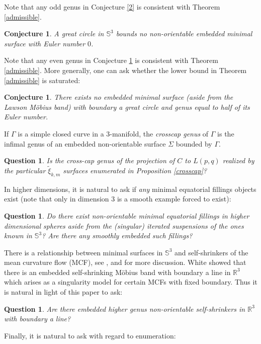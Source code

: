 \documentclass[11pt, reqno]{amsart}
\newtheorem{conj}[thm]{Conjecture}
\newtheorem{question}[thm]{Question}
\numberwithin{equation}{section}
\begin{document}
Note that any odd genus in Conjecture \ref{2} is consistent with Theorem \ref{admissible}.  

\begin{conj}\label{0}
A great circle in $\mathbb{S}^3$ bounds no non-orientable embedded minimal surface with Euler number $0$.
\end{conj}
Note that any even genus in Conjecture \ref{0} is consistent with Theorem \ref{admissible}.  
More generally, one can ask whether the lower bound in Theorem \ref{admissible} is saturated:
\begin{conj}
There exists no embedded minimal surface (aside from the Lawson M\"obius band) with boundary a great circle and genus equal to half of its Euler number.
\end{conj}
If $\Gamma$ is a simple closed curve in a $3$-manifold, the \emph{crosscap genus} of $\Gamma$ is the infimal genus of an embedded non-orientable surface $\Sigma$ bounded by $\Gamma$.  
\begin{question}
Is the cross-cap genus of the projection of $C$ to $L(p,q)$ realized by the particular $\tilde{\xi}_{k,m}$ surfaces enumerated in Proposition \ref{crosscap}?  
\end{question}

In higher dimensions, it is natural to ask if \emph{any} minimal equatorial fillings objects exist (note that only in dimension $3$ is a smooth example forced to exist):
\begin{question}
Do there exist non-orientable minimal equatorial fillings in higher dimensional spheres aside from the (singular) iterated suspensions of the ones known in $\mathbb{S}^3$?  Are there any \emph{smoothly embedded} such fillings?
\end{question}


There is a relationship between minimal surfaces in $\mathbb{S}^3$ and self-shrinkers of the mean curvature flow (MCF), see \cite{Bern}, and \cite{KZ} for more discussion.  White \cite{White3pi} showed that there is an embedded self-shrinking M\"obius band with boundary a line in $\mathbb{R}^3$ which arises as a singularity model for certain MCFs with fixed boundary. Thus it is natural in light of this paper to ask:
\begin{question}
Are there embedded higher genus non-orientable self-shrinkers in $\mathbb{R}^3$ with boundary a line?
\end{question}


Finally, it is natural to ask with regard to enumeration:
\end{document}
